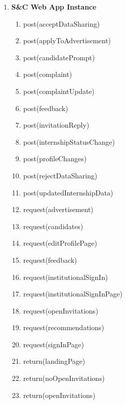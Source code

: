 \begin{enumerate}
\begin{enumerate}
    \end{enumerate}
    \item \textbf{S\&C Web App Instance}
    \begin{enumerate}
        \item post(acceptDataSharing)
        \item post(applyToAdvertisement)
        \item post(candidatePrompt)
        \item post(complaint)
        \item post(complaintUpdate)
        \item post(feedback)
        \item post(invitationReply)
        \item post(internshipStatusChange)
        \item post(profileChanges)
        \item post(rejectDataSharing)
        \item post(updatedInternshipData)
        \item request(advertisement)
        \item request(candidates)
        \item request(editProfilePage)
        \item request(feedback)
        \item request(institutionalSignIn)
        \item request(institutionalSignInPage)
        \item request(openInvitations)
        \item request(recommendations)
        \item request(signInPage)
        \item return(landingPage)
        \item return(noOpenInvitations)
        \item return(openInvitations)
    \end{enumerate}
\end{enumerate}
